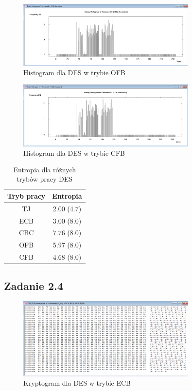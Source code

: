 \documentclass{article}
\begin{document}
\begin{figure}[H]
    \centering
    \includegraphics[width=0.8\textwidth]{cat_des_ofb_histogram.png}
    \caption{Histogram dla DES w trybie OFB}
\end{figure}


\begin{figure}[H]
    \centering
    \includegraphics[width=0.8\textwidth]{cat_des_cbf_histogram.png}
    \caption{Histogram dla DES w trybie CFB}
\end{figure}

\begin{table}[H]
    \centering
    \caption{Entropia dla różnych trybów pracy DES}
    \begin{tabular}{|c|c|}
        \hline
        Tryb pracy & Entropia \\ \hline
        TJ & 2.00 (4.7) \\ \hline
        ECB & 3.00 (8.0) \\ \hline
        CBC & 7.76 (8.0)\\ \hline
        OFB & 5.97 (8.0) \\ \hline
        CFB & 4.68 (8.0) \\ \hline
    \end{tabular}
\end{table}
\subsection{Zadanie 2.4}

\begin{figure}[H]
    \centering
    \includegraphics[width=0.8\textwidth]{cat_des_ecb.png}
    \caption{Kryptogram dla DES w trybie ECB}
\end{figure}
\end{document}
